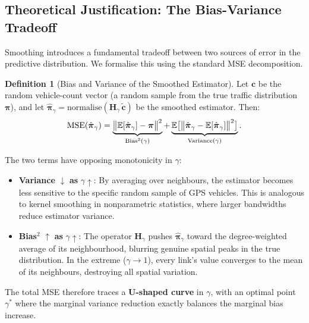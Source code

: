 \documentclass[12pt,a4paper]{article}
\theoremstyle{definition}
\newtheorem{definition}{Definition}[section]
\theoremstyle{plain}
\begin{document}
\subsection{Theoretical Justification: The Bias-Variance Tradeoff}
\label{sec:bv_theory}

Smoothing introduces a fundamental tradeoff between two sources of error in the
predictive distribution. We formalise this using the standard MSE decomposition.

\begin{definition}[Bias and Variance of the Smoothed Estimator]
  Let $\mathbf{c}$ be the random vehicle-count vector (a random sample from the
  true traffic distribution $\boldsymbol{\pi}$), and let
  $\hat{\boldsymbol{\pi}}_\gamma = \text{normalise}(\mathbf{H}_\gamma\,\tilde{\mathbf{c}})$
  be the smoothed estimator. Then:
  \begin{equation}
    \text{MSE}(\hat{\boldsymbol{\pi}}_\gamma)
    = \underbrace{\bigl\|\mathbb{E}[\hat{\boldsymbol{\pi}}_\gamma]
      - \boldsymbol{\pi}\bigr\|^2}_{\text{Bias}^2(\gamma)}
    + \underbrace{\mathbb{E}\bigl[\bigl\|\hat{\boldsymbol{\pi}}_\gamma
      - \mathbb{E}[\hat{\boldsymbol{\pi}}_\gamma]\bigr\|^2\bigr]}_{%
      \text{Variance}(\gamma)}.
    \label{eq:bv_decomp}
  \end{equation}
\end{definition}

The two terms have opposing monotonicity in $\gamma$:

\begin{itemize}
  \item \textbf{Variance} $\downarrow$ \textbf{as} $\gamma \uparrow$: By averaging over
    neighbours, the estimator becomes less sensitive to the specific random sample of
    GPS vehicles. This is analogous to kernel smoothing in nonparametric statistics,
    where larger bandwidths reduce estimator variance.

  \item \textbf{Bias}$^2$ $\uparrow$ \textbf{as} $\gamma \uparrow$: The operator
    $\mathbf{H}_\gamma$ pushes $\hat{\boldsymbol{\pi}}_\gamma$ toward the
    degree-weighted average of its neighbourhood, blurring genuine spatial peaks in the
    true distribution. In the extreme ($\gamma \to 1$), every link's value converges
    to the mean of its neighbours, destroying all spatial variation.
\end{itemize}

The total MSE therefore traces a \textbf{U-shaped curve} in $\gamma$, with an optimal
point $\gamma^*$ where the marginal variance reduction exactly balances the marginal
bias increase.
\end{document}
